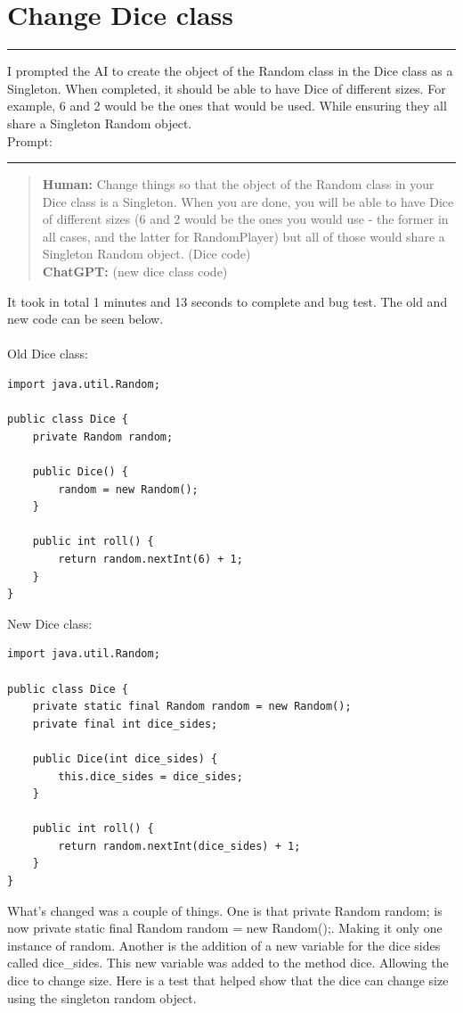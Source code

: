 \documentclass[a4paper,11pt]{article}
\begin{document}
\section*{Change Dice class}
\hrule
\vspace{10pt} %
I prompted the AI to create the object of the Random class in the Dice class as a Singleton. When completed, it should be able to have Dice of different sizes. For example, 6 and 2 would be the ones that would be used. While ensuring they all share a Singleton Random object.\\
Prompt:
\hrule
\vspace{4pt} %
\begin{quote}
\textbf{Human:} Change things so that the object of the Random class in your Dice class is a Singleton. When you are done, you will be able to have Dice of different sizes (6 and 2 would be the ones you would use - the former in all cases, and the latter for RandomPlayer) but all of those would share a Singleton Random object. (Dice code)\\
\textbf{ChatGPT:} (new dice class code) 
\end{quote}
It took in total 1 minutes and 13 seconds to complete and bug test. The old and new code can be seen below.\\\\
Old Dice class:
\begin{lstlisting}
import java.util.Random;

public class Dice {
    private Random random;

    public Dice() {
        random = new Random();
    }

    public int roll() {
        return random.nextInt(6) + 1;
    }
}
\end{lstlisting} 
New Dice class: \begin{lstlisting}
import java.util.Random;

public class Dice {
    private static final Random random = new Random();
    private final int dice_sides;

    public Dice(int dice_sides) {
        this.dice_sides = dice_sides;
    }

    public int roll() {
        return random.nextInt(dice_sides) + 1; 
    }
}
\end{lstlisting}
What's changed was a couple of things. One is that private Random random; is now private static final Random random = new Random();. Making it only one instance of random. Another is the addition of a new variable for the dice sides called dice\_sides.  This new variable was added to the method dice. Allowing the dice to change size. Here is a test that helped show that the dice can change size using the singleton random object. \\\\
\end{document}
